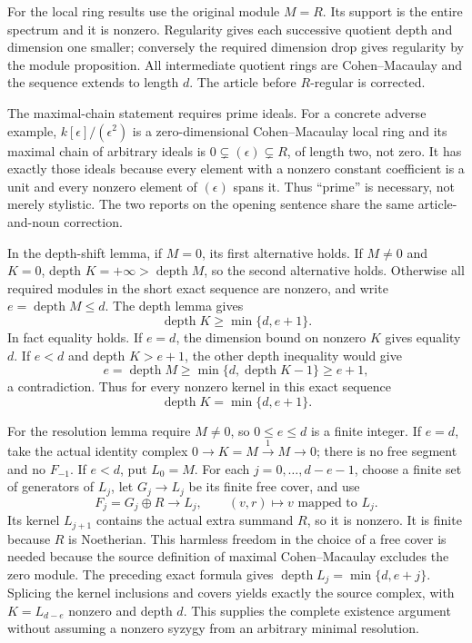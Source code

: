 For the local ring results use the original module \(M=R\). Its support is the entire spectrum and it is nonzero. Regularity gives each successive quotient depth and dimension one smaller; conversely the required dimension drop gives regularity by the module proposition. All intermediate quotient rings are Cohen--Macaulay and the sequence extends to length \(d\). The article before \(R\)-regular is corrected.

The maximal-chain statement requires prime ideals. For a concrete adverse example, \(k[\epsilon]/(\epsilon^2)\) is a zero-dimensional Cohen--Macaulay local ring and its maximal chain of arbitrary ideals is \(0\subsetneq(\epsilon)\subsetneq R\), of length two, not zero. It has exactly those ideals because every element with a nonzero constant coefficient is a unit and every nonzero element of \((\epsilon)\) spans it. Thus ``prime'' is necessary, not merely stylistic. The two reports on the opening sentence share the same article-and-noun correction.

In the depth-shift lemma, if \(M=0\), its first alternative holds. If \(M\ne0\) and \(K=0\), depth \(K=+\infty>\operatorname{depth}M\), so the second alternative holds. Otherwise all required modules in the short exact sequence are nonzero, and write \(e=\operatorname{depth}M\le d\). The depth lemma gives \[
 \operatorname{depth}K\ge\min\{d,e+1\}.
\] In fact equality holds. If \(e=d\), the dimension bound on nonzero \(K\) gives equality \(d\). If \(e<d\) and depth \(K>e+1\), the other depth inequality would give \[
 e=\operatorname{depth}M\ge
 \min\{d,\operatorname{depth}K-1\}\ge e+1,
\] a contradiction. Thus for every nonzero kernel in this exact sequence \[
 \operatorname{depth}K=\min\{d,e+1\}.
\]

For the resolution lemma require \(M\ne0\), so \(0\le e\le d\) is a finite integer. If \(e=d\), take the actual identity complex \(0\to K=M\xrightarrow{1}M\to0\); there is no free segment and no \(F_{-1}\). If \(e<d\), put \(L_0=M\). For each \(j=0,\ldots,d-e-1\), choose a finite set of generators of \(L_j\), let \(G_j\to L_j\) be its finite free cover, and use \[
 F_j=G_j\oplus R\longrightarrow L_j,\qquad (v,r)\longmapsto v\text{ mapped to }L_j.
\] Its kernel \(L_{j+1}\) contains the actual extra summand \(R\), so it is nonzero. It is finite because \(R\) is Noetherian. This harmless freedom in the choice of a free cover is needed because the source definition of maximal Cohen--Macaulay excludes the zero module. The preceding exact formula gives \(\operatorname{depth}L_j=\min\{d,e+j\}\). Splicing the kernel inclusions and covers yields exactly the source complex, with \(K=L_{d-e}\) nonzero and depth \(d\). This supplies the complete existence argument without assuming a nonzero syzygy from an arbitrary minimal resolution.

